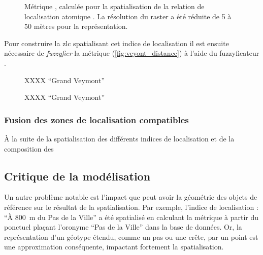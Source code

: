 \begin{figure}
  \centering
  
  \caption{Métrique \protect{}, calculée pour la
    spatialisation de la relation de localisation atomique
    \protect{}. La résolution
    du raster a été réduite de 5 à 50 mètres pour la représentation.}
  \label{fig:veyont_distance}
\end{figure}

Pour construire la \ac{zlc} spatialisant cet indice de localisation il
est ensuite nécessaire de \emph{fuzzyfier} la métrique
(\autoref{fig:veyont_distance}) à l'aide du fuzzyficateur
.

\begin{figure}
  \centering
  
  \caption{XXXX \enquote{Grand Veymont}}
  \label{fig:fuzzy_veyont_distance}
\end{figure}



\begin{figure}
  \centering
  
  \caption{XXXX \enquote{Grand Veymont}}
  \label{fig:Distance_GrandVeymont}
\end{figure}




\subsubsection{Fusion des zones de localisation compatibles}

À la suite de la spatialisation des différents indices de localisation
et de la composition des 

\subsection{Critique de la modélisation}
\label{subsec:9-2-3}


Un autre problème notable est l'impact que peut avoir la géométrie des
objets de référence sur le résultat de la spatialisation. Par exemple,
l'indice de localisation : \enquote{À \SI{800}{\meter} du Pas de la
  Ville} a été spatialisé en calculant la métrique
 à partir du ponctuel plaçant l'oronyme
\enquote{Pas de la Ville} dans la base de données. Or, la
représentation d'un géotype étendu, comme un pas ou une crête, par un
point est une approximation conséquente, impactant fortement la
spatialisation.


